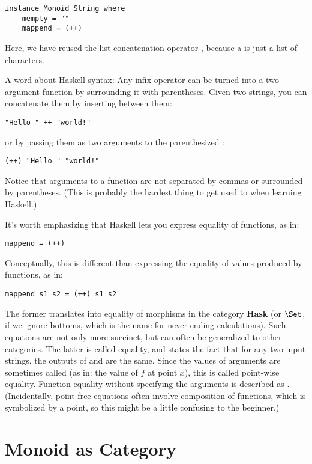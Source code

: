 \begin{Verbatim}
instance Monoid String where
    mempty = ""
    mappend = (++)
\end{Verbatim}
Here, we have reused the list concatenation operator \code{(++)},
because a  is just a list of characters.

A word about Haskell syntax: Any infix operator can be turned into a
two-argument function by surrounding it with parentheses. Given two
strings, you can concatenate them by inserting \code{++} between them:

\begin{Verbatim}
"Hello " ++ "world!"
\end{Verbatim}
or by passing them as two arguments to the parenthesized \code{(++)}:

\begin{Verbatim}
(++) "Hello " "world!"
\end{Verbatim}
Notice that arguments to a function are not separated by commas or
surrounded by parentheses. (This is probably the hardest thing to get
used to when learning Haskell.)

It's worth emphasizing that Haskell lets you express equality of
functions, as in:

\begin{Verbatim}
mappend = (++)
\end{Verbatim}
Conceptually, this is different than expressing the equality of values
produced by functions, as in:

\begin{Verbatim}
mappend s1 s2 = (++) s1 s2
\end{Verbatim}
The former translates into equality of morphisms in the category
\textbf{Hask} (or $\Set$, if we ignore bottoms, which is the name
for never-ending calculations). Such equations are not only more
succinct, but can often be generalized to other categories. The latter
is called  equality, and states the fact that for any
two input strings, the outputs of  and \code{(++)} are
the same. Since the values of arguments are sometimes called
 (as in: the value of $f$ at point $x$), this is called
point-wise equality. Function equality without specifying the arguments
is described as . (Incidentally, point-free equations
often involve composition of functions, which is symbolized by a point,
so this might be a little confusing to the beginner.)

\section{Monoid as Category}\label{monoid-as-category}

